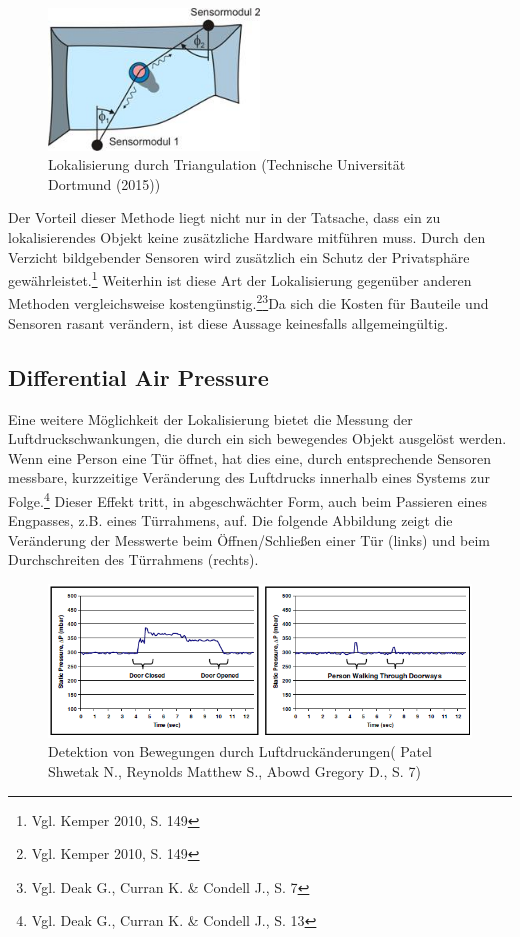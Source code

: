 \begin{figure}[H]
	\centering
	\includegraphics[width=0.5\textwidth]{pictures/triangulation}
	\caption{Lokalisierung durch Triangulation (Technische Universität Dortmund (2015))}
\end{figure}

Der Vorteil dieser Methode liegt nicht nur in der Tatsache, dass ein zu lokalisierendes Objekt keine zusätzliche Hardware mitführen muss. Durch den Verzicht bildgebender Sensoren wird zusätzlich ein Schutz der Privatsphäre gewährleistet.\footnote{Vgl. Kemper 2010, S. 149} Weiterhin ist diese Art der Lokalisierung gegenüber anderen Methoden vergleichsweise kostengünstig.\footnote{Vgl. Kemper 2010, S. 149}\footnote{Vgl. Deak G., Curran K. \& Condell J., S. 7}Da sich die Kosten für Bauteile und Sensoren rasant verändern, ist diese Aussage keinesfalls allgemeingültig. 

\subsection{Differential Air Pressure}
Eine weitere Möglichkeit der Lokalisierung bietet die Messung der Luftdruckschwankungen, die durch ein sich bewegendes Objekt ausgelöst werden. Wenn eine Person eine Tür öffnet, hat dies eine, durch entsprechende Sensoren messbare, kurzzeitige Veränderung des Luftdrucks innerhalb eines Systems zur Folge.\footnote{Vgl. Deak G., Curran K. \& Condell J., S. 13} Dieser Effekt tritt, in abgeschwächter Form, auch beim Passieren eines Engpasses, z.B. eines Türrahmens, auf. Die folgende Abbildung zeigt die Veränderung der Messwerte beim Öffnen/Schließen einer Tür (links) und beim Durchschreiten des Türrahmens (rechts).

\begin{figure}[H]
	\centering
	\includegraphics[width=1.0\textwidth]{pictures/dap_diagramm}
	\caption{Detektion von Bewegungen durch Luftdruckänderungen( Patel Shwetak N., Reynolds Matthew S., Abowd Gregory D., S. 7)}
\end{figure} 

